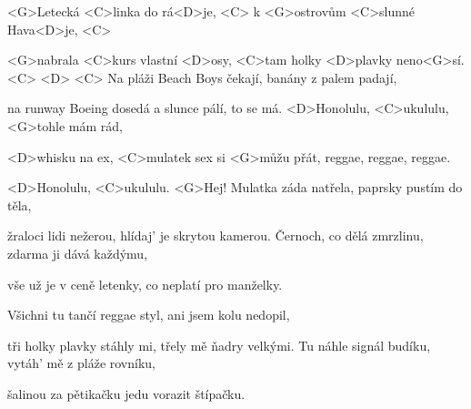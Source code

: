 

\zs

<G>Letecká <C>linka do rá<D>je, <C>
k <G>ostrovům <C>slunné Hava<D>je, <C>

<G>nabrala <C>kurs vlastní <D>osy,
<C>tam holky <D>plavky neno<G>sí. <C> <D> <C>
\ks
\zs
Na pláži Beach Boys čekají,
banány z palem padají,

na runway Boeing dosedá
a slunce pálí, to se má.
\ks
\zr
<D>Honolulu, <C>ukululu, <G>tohle mám rád,

<D>whisku na ex, <C>mulatek sex si <G>můžu přát,
reggae, reggae, reggae.

<D>Honolulu, <C>ukululu. <G>Hej!
\kr
\zs
Mulatka záda natřela,
paprsky pustím do těla,

žraloci lidi nežerou,
hlídaj' je skrytou kamerou.
\ks
\zs
Černoch, co dělá zmrzlinu,
zdarma ji dává každýmu,

vše už je v ceně letenky,
co neplatí pro manželky.
\ks

\zr
\kr

\zs
Všichni tu tančí reggae styl,
ani jsem kolu nedopil,

tři holky plavky stáhly mi,
třely mě ňadry velkými.
\ks
\zs
Tu náhle signál budíku,
vytáh' mě z pláže rovníku,

šalinou za pětikačku
jedu vorazit štípačku.
\ks

\zr
\kr

\kp





